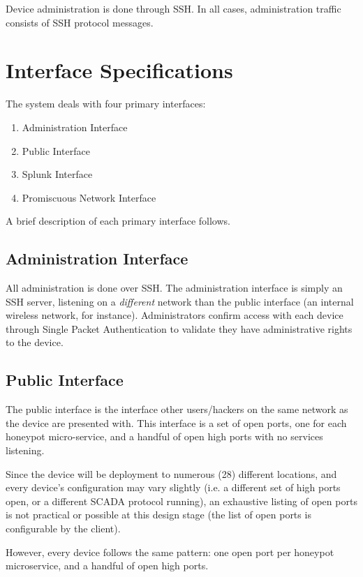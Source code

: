 Device administration is done through SSH. In all cases, administration
traffic consists of SSH protocol messages.


\section{Interface Specifications}

The system deals with four primary interfaces:

\begin{enumerate}
    \item Administration Interface
    \item Public Interface
    \item Splunk Interface
    \item Promiscuous Network Interface
\end{enumerate}

A brief description of each primary interface follows.

\subsection{Administration Interface}

All administration is done over SSH. The administration interface is
simply an SSH server, listening on a \textit{different} network than
the public interface (an internal wireless network, for instance).  Administrators confirm access with each device through Single Packet Authentication to validate they have administrative rights to the device.

\subsection{Public Interface}

The public interface is the interface other users/hackers on the same network
as the device are presented with. This interface is a set of open ports,
one for each honeypot micro-service, and a handful of open high ports with
no services listening.

Since the device will be deployment to numerous (28) different locations,
and every device's configuration may vary slightly (i.e. a different set of
high ports open, or a different SCADA protocol running), an exhaustive
listing of open ports is not practical or possible at this design stage
(the list of open ports is configurable by the client).

However, every device follows the same pattern: one open port per honeypot
microservice, and a handful of open high ports.

